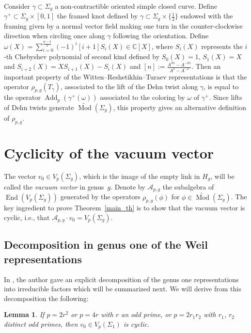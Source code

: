 \documentclass[11pt]{article}
\newcommand{\End}{\operatorname{End}}
\newcommand{\Mod}{\operatorname{Mod}}
\newcommand{\Add}{\operatorname{Add}}
\newcommand{\emcg}{\widetilde{\Mod}(\Sigma_g)}
\numberwithin{equation}{section}
\newtheorem{Lemma}[Theorem]{Lemma}
\begin{document}
Consider $\gamma\subset \Sigma_g$ a non-contractible oriented simple closed curve. Define $\gamma^+\subset \Sigma_g\times [0,1]$ the framed knot defined by $\gamma\subset \Sigma_g\times \big\{ \frac{1}{2} \big\}$ endowed with the framing given by a normal vector field making one turn in the counter-clockwise direction when circling once along $\gamma$ following the orientation. Define $\omega(X)=\sum\limits_{i=0}^ {\frac{p-4}{2}} (-1)^i [i+1]S_i(X) \in \mathbb{C}[X]$, where $S_i(X)$ represents the $i$-{th} Chebyshev polynomial of second kind defined by $S_0(X)=1$, $S_1(X)=X$ and $S_{i+2}(X)=XS_{i+1}(X)-S_i(X) $ and $[n]:= \frac{A^{2n}-A^{-2n}}{A^2 - A^{-2}}$. Then an important property of the Witten--Reshetikhin--Turaev representations is that the operator $\rho_{p,g}(T_{\gamma})$, associated to the lift of the Dehn twist along $\gamma$, is equal to the operator $\Add_p(\gamma^+(\omega))$ associated to the coloring by $\omega$ of $\gamma^+$. Since lifts of Dehn twists generate $\emcg$, this property gives an alternative definition of $\rho_{p,g}$.

\section{Cyclicity of the vacuum vector}

The vector $v_0\in V_p(\Sigma_g)$, which is the image of the empty link in $H_g$, will be called the \textit{vacuum vector} in genus~$g$. Denote by $\mathcal{A}_{p,g}$ the subalgebra of $\End(V_p(\Sigma_g))$ generated by the operators $\rho_{p,g}(\phi)$ for $\phi \in \emcg$. The key ingredient to prove Theorem~\ref{main_th} is to show that the vacuum vector is cyclic, i.e., that $\mathcal{A}_{p,g}\cdot v_0 =V_p(\Sigma_g)$.

\subsection{Decomposition in genus one of the Weil representations}
In \cite[Corollary 1.2]{Koju1}, the author gave an explicit decomposition of the genus one representations into irreducible factors which will be summarized next. We will derive from this decomposition the following:
\begin{Lemma}\label{lemma_genusone1} If $p=2r^2$ or $p=4r$ with $r$ an odd prime, or $p=2r_1r_2$ with $r_1$, $r_2$ distinct odd primes, then $v_0 \in V_p(\Sigma_1)$ is cyclic.
\end{Lemma}
\end{document}
